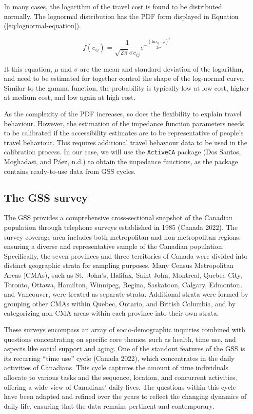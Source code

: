\documentclass[preprint, 3p,
authoryear]{elsarticle} %
\begin{document}
In many cases, the logarithm of the travel cost is found to be
distributed normally. The lognormal distribution has the PDF form
displayed in Equation (\ref{eq:lognormal-equation}).

\begin{equation}
f(c_{ij}) = \frac{1}{\sqrt{2\pi} \sigma c_{ij}} e^{-\frac{(\ln c_{ij} - \mu)^2}{2\sigma^2}}
\label{eq:lognormal-equation}
\end{equation}

It this equation, \(\mu\) and \(\sigma\) are the mean and standard
deviation of the logarithm, and need to be estimated for together
control the shape of the log-normal curve. Similar to the gamma
function, the probability is typically low at low cost, higher at medium
cost, and low again at high cost.

As the complexity of the PDF increases, so does the flexibility to
explain travel behaviour. However, the estimation of the impedance
function parameters needs to be calibrated if the accessibility
estimates are to be representative of people's travel behaviour. This
requires additional travel behaviour data to be used in the calibration
process. In our case, we will use the \texttt{ActiveCA} package (Dos
Santos, Moghadasi, and Páez, n.d.) to obtain the impedance functions, as
the package contains ready-to-use data from GSS cycles.

\subsection{The GSS survey}\label{the-gss-survey}

The GSS provides a comprehensive cross-sectional snapshot of the
Canadian population through telephone surveys established in 1985
(Canada 2022). The survey coverage area includes both metropolitan and
non-metropolitan regions, ensuring a diverse and representative sample
of the Canadian population. Specifically, the seven provinces and three
territories of Canada were divided into distinct geographic strata for
sampling purposes. Many Census Metropolitan Areas (CMAs), such as
St.~John's, Halifax, Saint John, Montreal, Quebec City, Toronto, Ottawa,
Hamilton, Winnipeg, Regina, Saskatoon, Calgary, Edmonton, and Vancouver,
were treated as separate strata. Additional strata were formed by
grouping other CMAs within Quebec, Ontario, and British Columbia, and by
categorizing non-CMA areas within each province into their own strata.

These surveys encompass an array of socio-demographic inquiries combined
with questions concentrating on specific core themes, such as health,
time use, and aspects like social support and aging. One of the standout
features of the GSS is its recurring ``time use'' cycle (Canada 2022),
which concentrates in the daily activities of Canadians. This cycle
captures the amount of time individuals allocate to various tasks and
the sequence, location, and concurrent activities, offering a wide view
of Canadians' daily lives. The questions within this cycle have been
adapted and refined over the years to reflect the changing dynamics of
daily life, ensuring that the data remains pertinent and contemporary.
\end{document}

